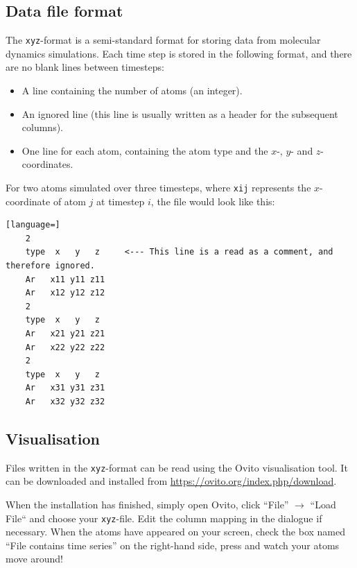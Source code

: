 \documentclass[11pt,british,a4paper]{report}
\begin{document}
\subsection{Data file format}\label{app:xyz}
The \texttt{xyz}-format is a semi-standard format for storing data from molecular dynamics simulations. Each time step is stored in the following format, and there are no blank lines between timesteps:
\begin{itemize}
    \item A line containing the number of atoms (an integer).
    \item An ignored line (this line is usually written as a header for the subsequent columns).
    \item One line for each atom, containing the atom type and the \(x\)-, \(y\)- and \(z\)-coordinates.
\end{itemize}
For two atoms simulated over three timesteps, where \texttt{xij} represents the \(x\)-coordinate of atom \(j\) at timestep \(i\), the file would look like this:
\begin{lstlisting}[language=]
    2
    type  x   y   z     <--- This line is a read as a comment, and therefore ignored.
    Ar   x11 y11 z11
    Ar   x12 y12 z12
    2
    type  x   y   z
    Ar   x21 y21 z21
    Ar   x22 y22 z22
    2
    type  x   y   z
    Ar   x31 y31 z31
    Ar   x32 y32 z32
\end{lstlisting}


\subsection{Visualisation}\label{app:ovito}
Files written in the \texttt{xyz}-format can be read using the Ovito visualisation tool. It can be downloaded and installed from \url{https://ovito.org/index.php/download}.

When the installation has finished, simply open Ovito, click ``File'' \(\to\) ``Load File`` and choose your \texttt{xyz}-file. Edit the column mapping in the dialogue if necessary. When the atoms have appeared on your screen, check the box named ``File contains time series'' on the right-hand side, press  and watch your atoms move around!

\end{document}
